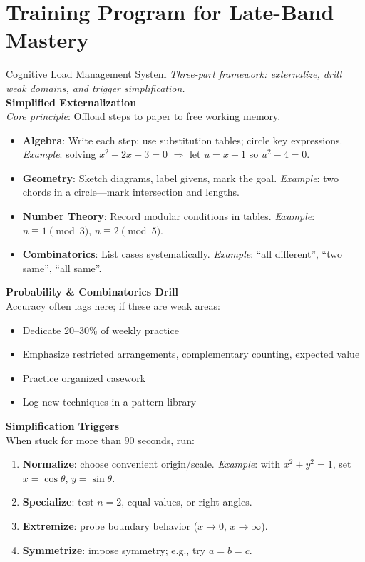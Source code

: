 \documentclass{article}
\begin{document}
\newpage

\section{Training Program for Late-Band Mastery}

\begin{trainingbox}{Cognitive Load Management System}
    \textit{Three-part framework: externalize, drill weak domains, and trigger simplification.}\\
    \textbf{Simplified Externalization}\\
    \textit{Core principle}: Offload steps to paper to free working memory.\\
    \begin{itemize}[nosep]
        \item \textbf{Algebra}: Write each step; use substitution tables; circle key expressions. \textit{Example}: solving $x^2+2x-3=0$ $\Rightarrow$ let $u=x+1$ so $u^2-4=0$.
        \item \textbf{Geometry}: Sketch diagrams, label givens, mark the goal. \textit{Example}: two chords in a circle—mark intersection and lengths.
        \item \textbf{Number Theory}: Record modular conditions in tables. \textit{Example}: $n\equiv1\pmod 3$, $n\equiv2\pmod 5$.
        \item \textbf{Combinatorics}: List cases systematically. \textit{Example}: ``all different'', ``two same'', ``all same''.
    \end{itemize}
    
    \textbf{Probability \& Combinatorics Drill}\\
    Accuracy often lags here; if these are weak areas:
    \begin{itemize}[nosep]
        \item Dedicate 20--30\% of weekly practice
        \item Emphasize restricted arrangements, complementary counting, expected value
        \item Practice organized casework
        \item Log new techniques in a pattern library
    \end{itemize}
    
    \textbf{Simplification Triggers}\\
    When stuck for more than $90$ seconds, run:
    \begin{enumerate}[nosep]
        \item \textbf{Normalize}: choose convenient origin/scale. \textit{Example}: with $x^2+y^2=1$, set $x=\cos\theta$, $y=\sin\theta$.
        \item \textbf{Specialize}: test $n=2$, equal values, or right angles.
        \item \textbf{Extremize}: probe boundary behavior ($x\to0$, $x\to\infty$).
        \item \textbf{Symmetrize}: impose symmetry; e.g., try $a=b=c$.
    \end{enumerate}
    \end{trainingbox}
    
\end{document}
